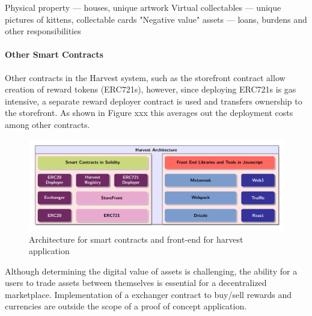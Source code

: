 \documentclass[12pt,tightenlines,letterpaper]{scrartcl}
\begin{document}
Physical property — houses, unique artwork
Virtual collectables — unique pictures of kittens, collectable cards
"Negative value" assets — loans, burdens and other responsibilities

\paragraph{Other Smart Contracts}
Other contracts in the Harvest system, such as the storefront contract allow creation of reward tokens (ERC721s), however, since deploying ERC721s is gas intensive, a separate reward deployer contract is used and transfers ownership to the storefront. As shown in Figure xxx this averages out the deployment costs among other contracts.

\begin{figure}[H]
\centering
\includegraphics[width=1\linewidth]{Images/harvestArchitecture}
\caption{Architecture for smart contracts and front-end for harvest application}
\label{fig:harvestarchitecture}
\end{figure}

 Although determining the digital value of assets is challenging, the ability for a users to trade assets between themselves is essential for a decentralized marketplace. Implementation of a exchanger contract to buy/sell rewards and currencies are outside the scope of a proof of concept application.

\end{document}
